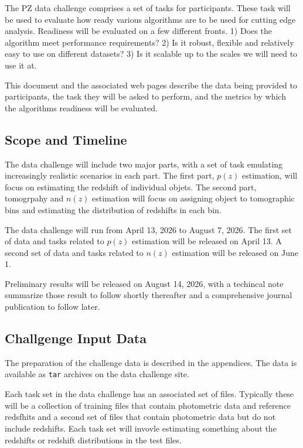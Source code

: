 \documentclass[modern]{desc-tex/styles/lsstdescnote}
\begin{document}
The PZ data challenge comprises a set of tasks for participants.
These task will be used to evaluate how ready various algorithms are
to be used for cutting edge analysis.  Readiness will be evaluated on
a few different fronts.  1) Does the algorithm meet performance
requirements?  2) Is it robust, flexible and relatively easy to use on
different datasets?  3) Is it scalable up to the scales we will need
to use it at.

This document and the associated web pages describe the data being
provided to participants, the task they will be asked to perform, and
the metrics by which the algorithms readiness will be evaluated.


\subsection{Scope and Timeline}

The data challenge will include two major parts, with a set of
task emulating increasingly realistic scenarios in each part.   The
first part, $p(z)$ estimation, will focus on estimating the redshift of
individual objets.   The second part, tomogrpahy and $n(z)$ estimation
will focus on assigning object to tomographic bins and estimating the
distribution of redshifts in each bin.

The data challenge will run from April 13, 2026 to August 7, 2026.
The first set of data and tasks related to $p(z)$ estimation will be
released on April 13.  A second set of data and tasks related to
$n(z)$ estimation will be released on June 1.

Preliminary results will be released on August 14, 2026, with a
techincal note summarize those result to follow shortly thereafter and
a comprehensive journal publication to follow later.


\subsection{Challgenge Input Data}

The preparation of the challenge data is described in the appendices.
The data is available as \texttt{tar} archives on the data challenge site.

Each task set in the data challenge has an associated set of files.
Typically these will be a collection of training files that contain
photometric data and reference redsfhits and a second set of files
that contain photometric data but do not include redshifts.   Each
task set will invovle estimating something about the redshifts or
redshift distributions in the test files.
\end{document}
